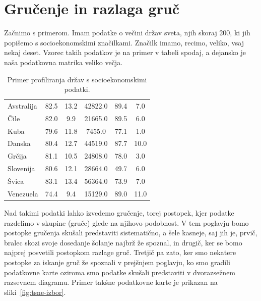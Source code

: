 \chapter{Gručenje in razlaga gruč}

Začnimo s primerom. Imam podatke o večini držav sveta, njih skoraj 200, ki jih popišemo s socioekonomskimi značilkami. Značilk imamo, recimo, veliko, vsaj nekaj deset. Vzorec takih podatkov je na primer v tabeli spodaj, a dejansko je naša podatkovna matrika veliko večja.

\begin{table}[htbp]
\caption{Primer profiliranja držav s socioekonomskimi podatki.}
\small
\centering
\renewcommand{\arraystretch}{1.2}
\begin{tabular}{
l
S[table-format=2.1]
S[table-format=2.1]
S[table-format=5.1]
S[table-format=2.1]
S[table-format=2.1]
}
\toprule
{} &
{} &
{} &
{} &
{} &
{} \\
\midrule
Avstralija & 82.5 & 13.2 & 42822.0 & 89.4 & 7.0 \\
Čile       & 82.0 & 9.9  & 21665.0 & 89.5 & 6.0 \\
Kuba       & 79.6 & 11.8 & 7455.0  & 77.1 & 1.0 \\
Danska     & 80.4 & 12.7 & 44519.0 & 87.7 & 10.0 \\
Grčija     & 81.1 & 10.5 & 24808.0 & 78.0 & 3.0 \\
Slovenija  & 80.6 & 12.1 & 28664.0 & 49.7 & 6.0 \\
Švica      & 83.1 & 13.4 & 56364.0 & 73.9 & 7.0 \\
Venezuela  & 74.4 & 9.4  & 15129.0 & 89.0 & 11.0 \\
\bottomrule
\end{tabular}
\label{tab:podatki-drzave}
\end{table}

Nad takimi podatki lahko izvedemo gručenje, torej postopek, kjer podatke razdelimo v skupine (gruče) glede na njihovo podobnost. V tem poglavju bomo postopke gručenja skušali predstaviti sistematično, a šele kasneje, saj jih je, prvič, bralec skozi svoje dosedanje šolanje najbrž že spoznal, in drugič, ker se bomo najprej posvetili postopkom razlage gruč. Tretjič pa zato, ker smo nekatere postopke za iskanje gruč že spoznali v prejšnjem poglavju, ko smo gradili podatkovne karte oziroma smo podatke skušali predstaviti v dvorazsežnem razsevnem diagramu. Primer takšne podatkovne karte je prikazan na sliki~\ref{fig:tsne-izbor}.


